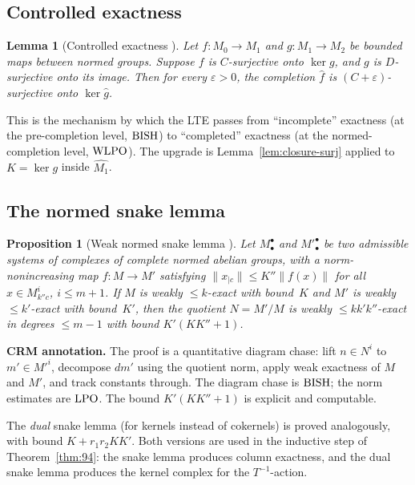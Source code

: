 \documentclass[11pt,a4paper]{article}
\theoremstyle{plain}
\newtheorem{lemma}[theorem]{Lemma}
\newtheorem{proposition}[theorem]{Proposition}
\theoremstyle{definition}
\newcommand{\BISH}{\textup{BISH}}
\newcommand{\WLPO}{\textup{WLPO}}
\newcommand{\LPO}{\textup{LPO}}
\begin{document}
\subsection{Controlled exactness}

\begin{lemma}[Controlled exactness {\cite{Commelin2022}}]
\label{lem:controlled-exact}
Let $f: M_0 \to M_1$ and $g: M_1 \to M_2$ be bounded maps between
normed groups.  Suppose $f$ is $C$-surjective onto $\ker g$, and
$g$ is $D$-surjective onto its image.  Then for every
$\varepsilon > 0$, the completion $\widehat{f}$ is
$(C+\varepsilon)$-surjective onto $\ker \widehat{g}$.
\end{lemma}

\noindent This is the mechanism by which the LTE passes from
``incomplete'' exactness (at the pre-completion level, $\BISH$) to
``completed'' exactness (at the normed-completion level, $\WLPO$).
The upgrade is Lemma~\ref{lem:closure-surj} applied to $K = \ker g$
inside $\widehat{M_1}$.

\subsection{The normed snake lemma}

\begin{proposition}[Weak normed snake lemma {\cite{Commelin2022}}]
\label{prop:snake}
Let $M_\bullet^\bullet$ and ${M'}_\bullet^\bullet$ be two admissible
systems of complexes of complete normed abelian groups, with a
norm-nonincreasing map $f: M \to M'$ satisfying
$\|x_{|c}\| \leq K'' \|f(x)\|$ for all $x \in M^i_{k''c}$,
$i \leq m+1$.  If $M$ is weakly $\leq k$-exact with bound~$K$
and $M'$ is weakly $\leq k'$-exact with bound~$K'$, then the
quotient $N = M'/M$ is weakly $\leq kk'k''$-exact in degrees
$\leq m-1$ with bound $K'(KK''+1)$.
\end{proposition}

\noindent\textbf{CRM annotation.}
The proof is a quantitative diagram chase: lift $n \in N^i$ to
$m' \in M'^i$, decompose $dm'$ using the quotient norm, apply
weak exactness of $M$ and $M'$, and track constants through.
The diagram chase is $\BISH$; the norm estimates are $\LPO$.
The bound $K'(KK''+1)$ is explicit and computable.

The \emph{dual} snake lemma (for kernels instead of cokernels)
is proved analogously, with bound $K + r_1 r_2 K K'$.
Both versions are used in the inductive step of Theorem~\ref{thm:94}:
the snake lemma produces column exactness,
and the dual snake lemma produces the kernel
complex for the $T^{-1}$-action.
\end{document}
